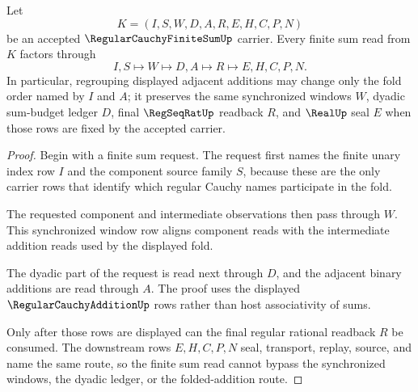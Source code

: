 \begin{theorem}\label{thm:regular-cauchy-finite-sum-budget-route}
Let
$$
K=(I,S,W,D,A,R,E,H,C,P,N)
$$
be an accepted $\RegularCauchyFiniteSumUp$ carrier. Every finite sum read from $K$ factors through
$$
I,S \longmapsto W \longmapsto D,A \longmapsto R \longmapsto E,H,C,P,N .
$$
In particular, regrouping displayed adjacent additions may change only the fold order named by $I$ and $A$; it preserves the same synchronized windows $W$, dyadic sum-budget ledger $D$, final $\RegSeqRatUp$ readback $R$, and $\RealUp$ seal $E$ when those rows are fixed by the accepted carrier.
\end{theorem}
\begin{proof}
Begin with a finite sum request. The request first names the finite unary index row $I$ and the component source family $S$, because these are the only carrier rows that identify which regular Cauchy names participate in the fold.

The requested component and intermediate observations then pass through $W$. This synchronized window row aligns component reads with the intermediate addition reads used by the displayed fold.

The dyadic part of the request is read next through $D$, and the adjacent binary additions are read through $A$. The proof uses the displayed $\RegularCauchyAdditionUp$ rows rather than host associativity of sums.

Only after those rows are displayed can the final regular rational readback $R$ be consumed. The downstream rows $E,H,C,P,N$ seal, transport, replay, source, and name the same route, so the finite sum read cannot bypass the synchronized windows, the dyadic ledger, or the folded-addition route.
\end{proof}



